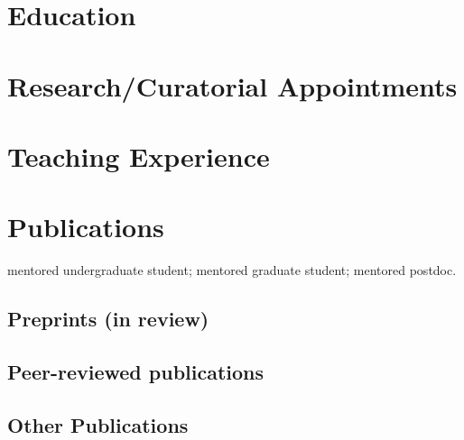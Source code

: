 


\newcommand{\longcontent}[1]{#1}

\newcommand{\oldcontent}[1]{}

\newcommand{\docTitle}{Curriculum Vitae\xspace}


\singlespacing



\section*{Education}


\section*{Research/Curatorial Appointments}


\longcontent{
\section*{Teaching Experience}

}

\section*{Publications}
\ugsymbol{}mentored undergraduate student;
\phdsymbol{}mentored graduate student;
\postdocsymbol{}mentored postdoc.

\subsection*{Preprints (in review)}
\nocite{*}
\printbibliography[filter=cvpreprints, heading=none]

\subsection*{Peer-reviewed publications}
\nocite{*}
\printbibliography[filter=cvpapersnopreprints, heading=none]

\longcontent{
\subsection*{Other Publications}

}

